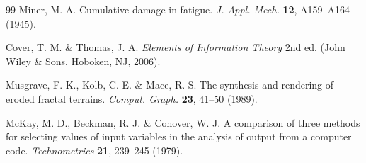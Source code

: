 \documentclass[11pt]{article}
\begin{document}
\begin{thebibliography}{99}
Miner, M. A. Cumulative damage in fatigue. \textit{J. Appl. Mech.} \textbf{12}, A159--A164 (1945).

Cover, T. M. \& Thomas, J. A. \textit{Elements of Information Theory} 2nd ed. (John Wiley \& Sons, Hoboken, NJ, 2006).

Musgrave, F. K., Kolb, C. E. \& Mace, R. S. The synthesis and rendering of eroded fractal terrains. \textit{Comput. Graph.} \textbf{23}, 41--50 (1989).

McKay, M. D., Beckman, R. J. \& Conover, W. J. A comparison of three methods for selecting values of input variables in the analysis of output from a computer code. \textit{Technometrics} \textbf{21}, 239--245 (1979).

\end{thebibliography}
\end{document}
